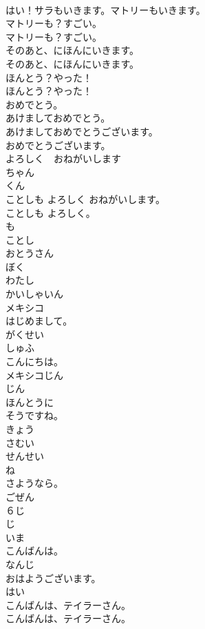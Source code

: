 \documentclass[8pt]{extreport}
\begin{document}
\begin{CJK}{UTF8}{min}
\\	はい！サラもいきます。マトリーもいきます。 
\\	マトリーも？すごい。	
\\	マトリーも？すごい。 
\\	そのあと、にほんにいきます。	
\\	そのあと、にほんにいきます。 
\\	ほんとう？やった！	
\\	ほんとう？やった！ 
\\	おめでとう。
\\	あけましておめでとう。
\\	あけましておめでとうございます。
\\	おめでとうございます。
\\	よろしく　おねがいします
\\	ちゃん
\\	くん
\\	ことしも よろしく おねがいします。
\\	ことしも よろしく。
\\	も
\\	ことし
\\	おとうさん
\\	ぼく
\\	わたし
\\	かいしゃいん
\\	メキシコ
\\	はじめまして。
\\	がくせい
\\	しゅふ
\\	こんにちは。
\\	メキシコじん
\\	じん
\\	ほんとうに
\\	そうですね。
\\	きょう
\\	さむい
\\	せんせい
\\	ね
\\	さようなら。
\\	ごぜん
\\	６じ
\\	じ
\\	いま
\\	こんばんは。
\\	なんじ
\\	おはようございます。
\\	はい
\\	こんばんは、テイラーさん。	
\\	こんばんは、テイラーさん。 

\end{CJK}
\end{document}
